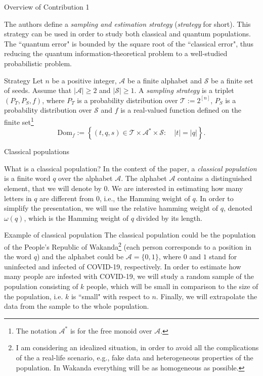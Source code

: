 \documentclass{beamer}
\begin{document}
\begin{frame}{Overview of Contribution 1}

The authors define a \emph{sampling and estimation strategy} (\emph{strategy} for short). This strategy can be used in order to study both classical and quantum populations. The ``quantum error" is bounded by the square root of the ``classical error", thus reducing the quantum information-theoretical problem to a well-studied probabilistic problem.
\end{frame}

\begin{frame}{Strategy}
Let $n$ be a positive integer, $\mathcal{A}$ be a finite alphabet and $\mathcal{S}$ be a finite set of seeds. Assume that $|\mathcal{A}| \geq 2$ and $|\mathcal{S}| \geq 1$. A \emph{sampling strategy} is a triplet $\left( P_T, P_S, f \right)$, where $P_T$ is a probability distribution over $\mathcal{T} := 2^{[n]}$, $P_S$ is a probability distribution over $\mathcal{S}$ and $f$ is a real-valued function defined on the finite set\footnote{The notation $\mathcal{A}^{\ast}$ is for the free monoid over $\mathcal{A}$.}
$$
\textrm{Dom}_f := \left\{ (t, q, s)\in \mathcal{T}\times \mathcal{A}^{\ast} \times \mathcal{S}: \quad |t| = |q| \right\}.
$$
\end{frame}

\begin{frame}
\begin{center}
\Large{Classical populations}
\end{center}
\end{frame}

\begin{frame}{What is a classical population?} 
In the context of the paper, a \emph{classical population} is a finite word $q$ over the alphabet $\mathcal{A}$. The alphabet $\mathcal{A}$ contains a distinguished element, that we will denote by $0$. We are interested in estimating how many letters in $q$ are different from $0$, i.e., the Hamming weight of $q$. In order to simplify the presentation, we will use the relative hamming weight of $q$, denoted $\omega(q)$, which is the Hamming weight of $q$ divided by its length.
\end{frame}

\begin{frame}{Example of classical population} 
The classical population could  be the population of the People's Republic of Wakanda\footnote{I am considering an idealized situation, in order to avoid all the complications of the a real-life scenario, e.g., fake data and heterogeneous properties of the population. In Wakanda everything will be as homogeneous as possible.} (each person corresponds to a position in the word $q$) and the alphabet could be $\mathcal{A} = \{0, 1\}$, where $0$ and $1$ stand for  uninfected and infected of COVID-19, respectively. In order to estimate how many people are infested with COVID-19, we will study a random sample of the population consisting of $k$ people, which will be small in comparison to the size of the population, i.e. $k$ is ``small" with respect to $n$. Finally, we will extrapolate the data from the sample to the whole population.
\end{frame}
\end{document}
